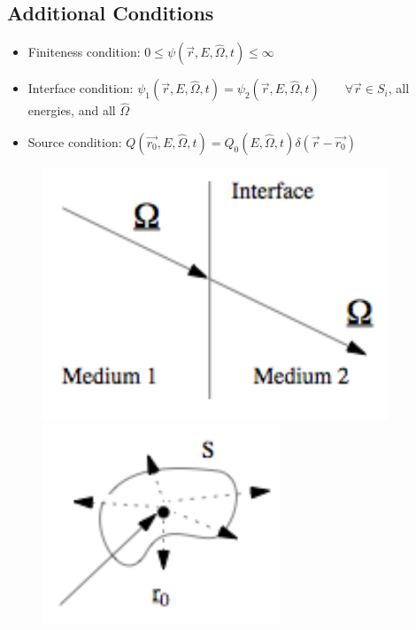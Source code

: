 \documentclass[12pt]{article}
\newcommand{\vOmega}{\ensuremath{\hat{\Omega}}}
\begin{document}
\subsection*{Additional Conditions}
\begin{itemize}
\item Finiteness condition: $0 \leq \psi(\vec{r}, E, \vOmega, t) \leq \infty$
\item Interface condition: $\psi_1(\vec{r}, E, \vOmega, t) = \psi_2(\vec{r}, E, \vOmega, t) \qquad \forall \vec{r} \in S_i$, all energies, and all $\vOmega$
\item Source condition: $Q(\vec{r_0}, E, \vOmega, t) = Q_0(E, \vOmega, t)\delta(\vec{r} - \vec{r_0})$
\end{itemize}

\begin{figure}[h!]
    \begin{center}
    \includegraphics[keepaspectratio, width = 1.5 in]{interface}
     \includegraphics[keepaspectratio, width = 1.5 in]{source}
    \end{center}
\end{figure}
\end{document}
